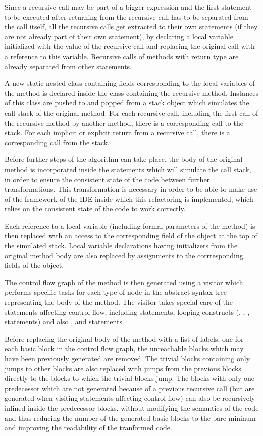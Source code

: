 Since a recursive call may be part of a bigger expression and the first statement to be executed after returning from
the recursive call has to be separated from the call itself, all the recursive calls get extracted to their own
statements (if they are not already part of their own statement), by declaring a local variable initialized with the
value of the recursive call and replacing the original call with a reference to this variable. Recursive calls of
methods with  return type are already separated from other statements.

A new static nested class containing fields corresponding to the local variables of the method is declared inside the
class containing the recursive method. Instances of this class are pushed to and popped from a stack object which
simulates the call stack of the original method. For each recursive call, including the first call of the recursive
method by another method, there is a corresponding  call to the stack. For each implicit or explicit return
from a recursive call, there is a corresponding  call from the stack.

Before further steps of the algorithm can take place, the body of the original method is incorporated inside the
statements which will simulate the call stack, in order to ensure the consistent state of the code between further
transformations. This transformation is necessary in order to be able to make use of the framework of the IDE inside
which this refactoring is implemented, which relies on the consistent state of the code to work correctly.

Each reference to a local variable (including formal parameters of the method) is then replaced with an access to the
corresponding field of the  object at the top of the simulated stack. Local variable declarations having
initializers from the original method body are also replaced by assignments to the corrresponding fields of the
 object.

The control flow graph of the method is then generated using a visitor which performs specific tasks for each type of
node in the abstract syntax tree representing the body of the method. The visitor takes special care of the statements
affecting control flow, including  statements, looping constructs (, , ,
 statements) and also ,  and  statements.

Before replacing the original body of the method with a list of  labels, one for each basic block in the
control flow graph, the unreachable blocks which may have been previously generated are removed. The trivial blocks
containing only jumps to other blocks are also replaced with jumps from the previous blocks directly to the blocks to
which the trivial blocks jump. The blocks with only one predecessor which are not generated because of a previous
recursive call (but are generated when visiting statements affecting control flow) can also be recursively inlined
inside the predecessor blocks, without modifying the semantics of the code and thus reducing the number of the generated
basic blocks to the bare mininum and improving the readability of the tranformed code.

